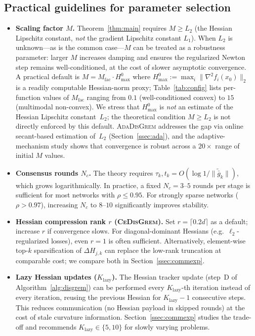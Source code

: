 \documentclass[11pt,a4paper]{article}
\def\cO{O}%
\newcommand{\cO}{\mathcal{O}}
\begin{document}
	\subsection{Practical guidelines for parameter selection}\label{ssec:practical}
	
	\begin{itemize}[leftmargin=1.2em,itemsep=2pt]
		\item \textbf{Scaling factor $M$.}
		Theorem~\ref{thm:main} requires $M\ge L_2$
		(the Hessian Lipschitz constant, \emph{not} the gradient Lipschitz
		constant $L_1$).
		When $L_2$ is unknown---as is the common case---$M$ can be treated
		as a robustness parameter: larger $M$ increases damping and ensures the
		regularized Newton step remains well-conditioned, at the cost of
		slower asymptotic convergence.
		A practical default is $M = M_{\mathrm{fac}} \cdot H_{\max}^{0}$ where
		$H_{\max}^{0} := \max_i\|\nabla^2 f_i(x_0)\|_2$ is a readily
		computable Hessian-norm proxy;
		Table~\ref{tab:config} lists per-function values of $M_{\mathrm{fac}}$
		ranging from $0.1$ (well-conditioned convex) to $15$ (multimodal non-convex).
		We stress that $H_{\max}^{0}$ is \emph{not} an estimate of the Hessian
		Lipschitz constant~$L_2$; the theoretical condition $M\ge L_2$
		is not directly enforced by this default.
		\textsc{AdaDisGrem} addresses the gap via online secant-based
		estimation of~$L_2$ (Section~\ref{ssec:ada}), and the
		adaptive-mechanism study shows that convergence is robust
		across a $20\times$ range of initial $M$ values.
		\item \textbf{Consensus rounds $N_c$.}
		The theory requires $\tau_k, t_k = \cO(\log 1/\|\tilde{\bar g}_k\|)$, which grows
		logarithmically.  In practice, a fixed $N_c = 3$--$5$ rounds per stage is sufficient
		for most networks with $\rho \le 0.95$.
		For strongly sparse networks ($\rho > 0.97$), increasing $N_c$ to $8$--$10$
		significantly improves stability.
		\item \textbf{Hessian compression rank $r$ (\textsc{CeDisGrem}).}
		Set $r = \lceil 0.2d \rceil$ as a default; increase $r$ if convergence slows.
		For diagonal-dominant Hessians (e.g.\ $\ell_2$-regularized losses), even $r=1$
		is often sufficient.
		Alternatively, element-wise top-$k$ sparsification of $\Delta H_{j,k}$
		can replace the low-rank truncation at comparable cost; we compare both in
		Section~\ref{ssec:commexp}.
		\item \textbf{Lazy Hessian updates ($K_{\mathrm{lazy}}$).}
		The Hessian tracker update (step~D of Algorithm~\ref{alg:disgrem}) can be
		performed every $K_{\mathrm{lazy}}$-th iteration instead of every iteration,
		reusing the previous Hessian for $K_{\mathrm{lazy}}{-}1$ consecutive steps.
		This reduces communication (no Hessian payload in skipped rounds) at the cost
		of stale curvature information.
		Section~\ref{ssec:commexp} studies the trade-off and recommends
		$K_{\mathrm{lazy}}\in\{5,10\}$ for slowly varying problems.
	\end{itemize}
	
\end{document}
